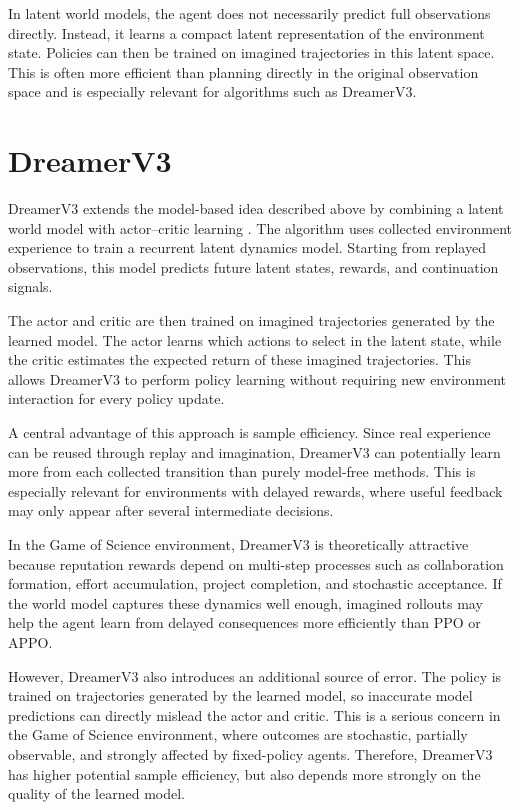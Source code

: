 \documentclass[english,bachelor]{hsluthesis}
\begin{document}
In latent world models, the agent does not necessarily predict full observations directly. Instead, it learns a compact latent representation of the environment state. Policies can then be trained on imagined trajectories in this latent space. This is often more efficient than planning directly in the original observation space and is especially relevant for algorithms such as DreamerV3.

\section{DreamerV3}

DreamerV3 extends the model-based idea described above by combining a latent world model with actor--critic learning \cite{hafner2024masteringdiversedomainsworld}. The algorithm uses collected environment experience to train a recurrent latent dynamics model. Starting from replayed observations, this model predicts future latent states, rewards, and continuation signals.

The actor and critic are then trained on imagined trajectories generated by the learned model. The actor learns which actions to select in the latent state, while the critic estimates the expected return of these imagined trajectories. This allows DreamerV3 to perform policy learning without requiring new environment interaction for every policy update.

A central advantage of this approach is sample efficiency. Since real experience can be reused through replay and imagination, DreamerV3 can potentially learn more from each collected transition than purely model-free methods. This is especially relevant for environments with delayed rewards, where useful feedback may only appear after several intermediate decisions.

In the Game of Science environment, DreamerV3 is theoretically attractive because reputation rewards depend on multi-step processes such as collaboration formation, effort accumulation, project completion, and stochastic acceptance. If the world model captures these dynamics well enough, imagined rollouts may help the agent learn from delayed consequences more efficiently than PPO or APPO.

However, DreamerV3 also introduces an additional source of error. The policy is trained on trajectories generated by the learned model, so inaccurate model predictions can directly mislead the actor and critic. This is a serious concern in the Game of Science environment, where outcomes are stochastic, partially observable, and strongly affected by fixed-policy agents. Therefore, DreamerV3 has higher potential sample efficiency, but also depends more strongly on the quality of the learned model.
\end{document}
